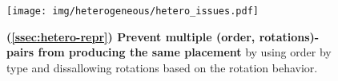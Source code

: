 \begin{figure}[H]
\centering
\vspace{-0.5em}
\captionsetup{justification=centering}
%
\texttt{[image: img/heterogeneous/hetero\_issues.pdf]}
%
\caption{\textbf{(\textsection \ref{ssec:hetero-repr}) Prevent multiple (order, rotations)-pairs from producing the same placement} by using order by type and dissallowing rotations based on the rotation behavior.}
\label{fig:hetero-issues}
\end{figure}
